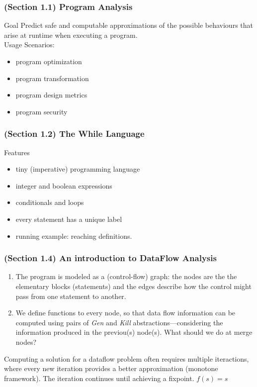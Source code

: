 \begin{frame}
  \frametitle{(Section 1.1) Program Analysis}

  \begin{block}{Goal}
    Predict {\color{blue}safe} and {\color{blue}computable approximations} of the possible
    behaviours that arise at runtime when executing a program. \pause \\
    Usage Scenarios:
    \begin{itemize}
     \item program optimization
     \item program transformation
     \item program design metrics
     \item program security
    \end{itemize}
  \end{block}
\end{frame}

\begin{frame}
  \frametitle{(Section 1.2) The While Language}

  \begin{block}{Features}
    \begin{itemize}
     \item tiny (imperative) programming language
     \item integer and boolean expressions  
     \item conditionals and loops \pause
     \item every statement has a unique label  
    \end{itemize}
  \end{block}

  \begin{itemize}
    \item running example: reaching definitions. 
  \end{itemize}
\end{frame}

\begin{frame}
  \frametitle{(Section 1.4) An introduction to DataFlow Analysis}

  \begin{enumerate}
    \item The program is modeled as a (control-flow) graph: the nodes are the
  the elementary blocks (statements) and the edges describe how the
  control might pass from one statement to another.

    \item We define functions to every node, so that data flow information
      can be computed using pairs of \emph{Gen} and \emph{Kill} abstractions---considering the
      information produced in the previou(s) node(s). What should we do
      at merge nodes?
  \end{enumerate}

  \pause Computing a solution for a dataflow problem often
  requires multiple iteractions, where every new iteration
  provides a better approximation (monotone framework).
  The iteration continues until achieving a {\color{blue}fixpoint}.
  \pause $f(s) = s$
  
\end{frame}

